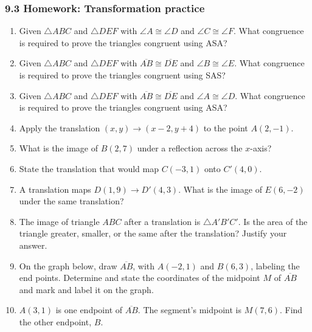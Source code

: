 \documentclass[12pt, twoside]{article}
\begin{document}
\subsubsection*{9.3 Homework: Transformation practice}
  \begin{enumerate}

  \item Given $\triangle ABC$ and $\triangle DEF$ with $\angle A \cong \angle D$ and $\angle C \cong \angle F$. What congruence is required to prove the triangles congruent using ASA? \vspace{3cm}
  
  \item Given $\triangle ABC$ and $\triangle DEF$ with $\overline{AB} \cong \overline{DE}$ and $\angle B \cong \angle E$. What congruence is required to prove the triangles congruent using SAS? \vspace{3cm}
  
  \item Given $\triangle ABC$ and $\triangle DEF$ with $\overline{AB} \cong \overline{DE}$ and $\angle A \cong \angle D$. What congruence is required to prove the triangles congruent using ASA? \vspace{3cm}
  
  \item Apply the translation $(x,y) \rightarrow (x-2,y+4)$ to the point $A(2,-1)$. \vspace{2cm}
  \item What is the image of $B(2,7)$ under a reflection across the $x$-axis? \vspace{2cm}
  \item State the translation that would map $C(-3,1)$ onto $C'(4,0)$. \vspace{3cm}

  \newpage
    \item A translation maps $D(1,9) \rightarrow D'(4,3)$. What is the image of $E(6,-2)$ under the same translation?  \vspace{3cm}

  \item The image of triangle $ABC$ after a translation is $\triangle A'B'C'$. Is the area of the triangle greater, smaller, or the same after the translation? Justify your answer. \vspace{3cm}

  \item On the graph below, draw $\overline{AB}$, with $A(-2,1)$ and $B(6,3)$, labeling the end points. Determine and state the coordinates of the midpoint $M$ of $\overline{AB}$ and mark and label it on the graph.\\
      \vspace{2cm}

  \item $A(3,1)$ is one endpoint of $\overline{AB}$. The segment's midpoint is $M(7,6)$. Find the other endpoint, $B$. 
  
\end{enumerate}
\end{document}
